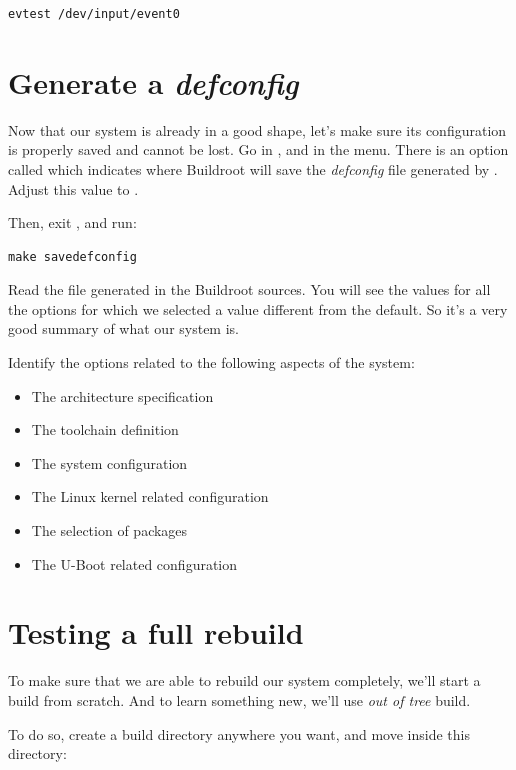 \begin{verbatim}
evtest /dev/input/event0
\end{verbatim}

\section{Generate a {\em defconfig}}

Now that our system is already in a good shape, let's make sure its
configuration is properly saved and cannot be lost. Go in
, and in the  menu. There is an
option called  which indicates
where Buildroot will save the {\em defconfig} file generated by
. Adjust this value to
.

Then, exit , and run:

\begin{verbatim}
make savedefconfig
\end{verbatim}

Read the file  generated in the
Buildroot sources. You will see the values for all the options for
which we selected a value different from the default. So it's a very
good summary of what our system is.

Identify the options related to the following aspects of the system:

\begin{itemize}
\item The architecture specification
\item The toolchain definition
\item The system configuration
\item The Linux kernel related configuration
\item The selection of packages
\item The U-Boot related configuration
\end{itemize}

\section{Testing a full rebuild}

To make sure that we are able to rebuild our system completely, we'll
start a build from scratch. And to learn something new, we'll use {\em
  out of tree} build.

To do so, create a build directory anywhere you want, and move inside
this directory:

